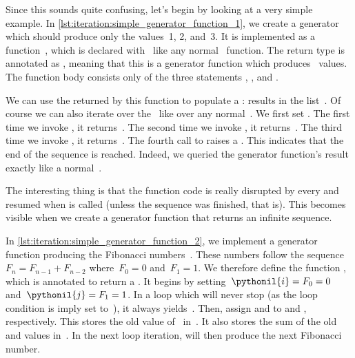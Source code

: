 Since this sounds quite confusing, let's begin by looking at a very simple example.
In \cref{lst:iteration:simple_generator_function_1}, we create a generator which should produce only the values~1, 2, and~3.
It is implemented as a function~, which is declared with~ like any normal \python\ function.
The return type is annotated as , meaning that this is a generator function which produces~ values.
The function body consists only of the three statements , , and .

We can use the  returned by this function to populate a :
 results in the list~\pythonil{[1, 2, 3]}.
Of course we can also iterate over the~ like over any normal~.
We first set .
The first time we invoke , it returns~.
The second time we invoke , it returns~.
The third time we invoke , it returns~.
The fourth call to  raises a .
This indicates that the end of the sequence is reached.
Indeed, we queried the generator function's result exactly like a normal~.

The interesting thing is that the function code is really disrupted by every  and resumed when  is called (unless the sequence was finished, that is).
This becomes visible when we create a generator function that returns an infinite sequence.

In \cref{lst:iteration:simple_generator_function_2}, we implement a generator function producing the Fibonacci numbers~\cite{W2024FN,S2022FLAATIMEOLPBOC}.
These numbers follow the sequence~$F_n=F_{n-1} + F_{n-2}$ where~$F_0=0$ and~$F_1=1$.
We therefore define the function , which is annotated to return a .
It begins by setting~$\pythonil{i}=F_0=0$ and~$\pythonil{j}=F_1=1$.
In a  loop which will never stop (as the loop condition is imply set to~), it always yields~.
Then, assign  and  to  and , respectively.
This stores the old value of~ in~.
It also stores the sum of the old  and  values in~.
In the next loop iteration,  will then produce the next Fibonacci number.

